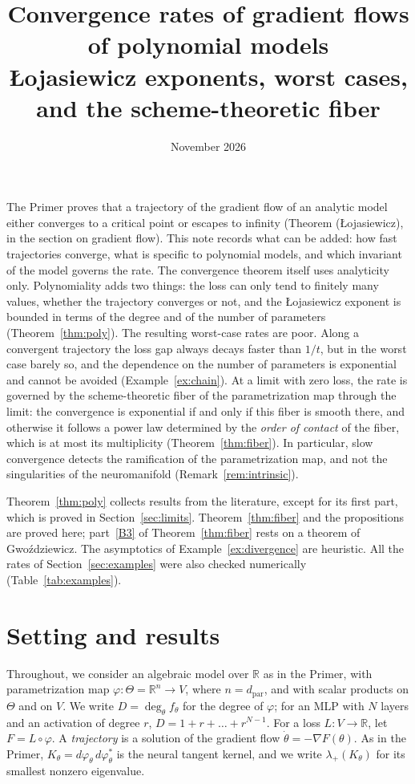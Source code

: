 \documentclass[11pt]{article}
\title{Convergence rates of gradient flows of polynomial models\\[4pt]\large {\L}ojasiewicz exponents, worst cases, and the scheme-theoretic fiber}
\author{}
\date{November 2026}
\theoremstyle{definition}
\theoremstyle{remark}
\newcommand{\R}{\mathbb{R}}
\newcommand{\dpar}{d_{\mathrm{par}}}
\begin{document}
\maketitle

\noindent
The Primer proves that a trajectory of the gradient flow of an analytic model either converges to a critical point or escapes to infinity (Theorem ({\L}ojasiewicz), in the section on gradient flow). This note records what can be added: how fast trajectories converge, what is specific to polynomial models, and which invariant of the model governs the rate. The convergence theorem itself uses analyticity only. Polynomiality adds two things: the loss can only tend to finitely many values, whether the trajectory converges or not, and the {\L}ojasiewicz exponent is bounded in terms of the degree and of the number of parameters (Theorem~\ref{thm:poly}). The resulting worst-case rates are poor. Along a convergent trajectory the loss gap always decays faster than $1/t$, but in the worst case barely so, and the dependence on the number of parameters is exponential and cannot be avoided (Example~\ref{ex:chain}). At a limit with zero loss, the rate is governed by the scheme-theoretic fiber of the parametrization map through the limit: the convergence is exponential if and only if this fiber is smooth there, and otherwise it follows a power law determined by the \emph{order of contact} of the fiber, which is at most its multiplicity (Theorem~\ref{thm:fiber}). In particular, slow convergence detects the ramification of the parametrization map, and not the singularities of the neuromanifold (Remark~\ref{rem:intrinsic}).

\smallskip\noindent
Theorem~\ref{thm:poly} collects results from the literature, except for its first part, which is proved in Section~\ref{sec:limits}. Theorem~\ref{thm:fiber} and the propositions are proved here; part~\ref{B3} of Theorem~\ref{thm:fiber} rests on a theorem of Gwo\'zdziewicz. The asymptotics of Example~\ref{ex:divergence} are heuristic. All the rates of Section~\ref{sec:examples} were also checked numerically (Table~\ref{tab:examples}).

\section{Setting and results}

Throughout, we consider an algebraic model over $\R$ as in the Primer, with parametrization map $\varphi\colon\Theta=\R^n\to V$, where $n=\dpar$, and with scalar products on $\Theta$ and on $V$. We write $D=\deg_\theta f_\theta$ for the degree of $\varphi$; for an MLP with $N$ layers and an activation of degree $r$, $D=1+r+\dots+r^{N-1}$. For a loss $L\colon V\to\R$, let $F=L\circ\varphi$. A \emph{trajectory} is a solution of the gradient flow $\dot\theta=-\nabla F(\theta)$. As in the Primer, $K_\theta=d\varphi_\theta\,d\varphi_\theta^*$ is the neural tangent kernel, and we write $\lambda_+(K_\theta)$ for its smallest nonzero eigenvalue.
\end{document}
